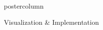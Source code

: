 \documentclass[final,hyperref={pdfpagelabels=false}]{beamer}
\newcommand{\bfBlue}[1]{\textcolor{koaladarkestblue}{\textbf{#1}}}
\begin{document}
\begin{frame}
\begin{columns}
\begin{column}{1\textwidth}
\begin{columns}[T]
\begin{column}{.484\textwidth}
\begin{beamercolorbox}[center,wd=\textwidth]{postercolumn}
\begin{minipage}[T]{.95\textwidth}
\begin{block}{\footnotesize Visualization \& Implementation}

%
%
%
%
%
%
%

\end{block}
\end{minipage}
\end{beamercolorbox}
\end{column}
\end{columns}
\end{column}
\end{columns}
\end{frame}
\end{document}
